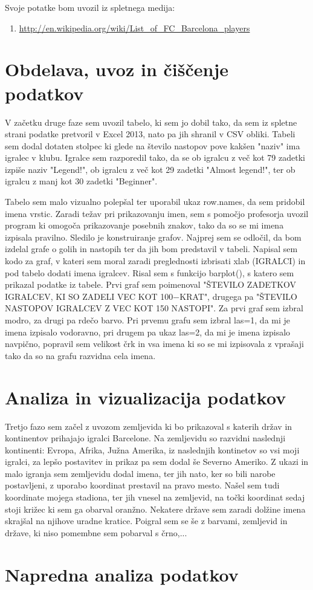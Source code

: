 \documentclass[11pt,a4paper]{article}
\begin{document}
Svoje potatke bom uvozil iz spletnega medija: 


\begin{enumerate}
\item{\url{http://en.wikipedia.org/wiki/List_of_FC_Barcelona_players
}}
\end{enumerate}

\section{Obdelava, uvoz in čiščenje podatkov}
V začetku druge faze sem uvozil tabelo, ki sem jo dobil tako, da sem iz spletne strani podatke pretvoril v Excel 2013, nato pa jih shranil v CSV obliki. Tabeli sem dodal dotaten stolpec ki glede na število nastopov pove kakšen "naziv" ima igralec v klubu. Igralce sem razporedil tako, da se ob igralcu z več kot 79 zadetki izpiše naziv "Legend!", ob igralcu z več kot 29 zadetki "Almost legend!", ter ob igralcu z manj kot 30 zadetki "Beginner".

Tabelo sem malo vizualno polepšal ter uporabil ukaz row.names, da sem pridobil imena vrstic. Zaradi težav pri prikazovanju imen, sem s pomočjo profesorja uvozil program ki omogoča prikazovanje posebnih znakov, tako da so se mi imena izpisala pravilno.
Sledilo je konstruiranje grafov. Najprej sem se odločil, da bom izdelal grafe o golih in nastopih ter da jih bom predstavil v tabeli. Napisal sem kodo za graf, v kateri sem moral zaradi preglednosti izbrisati xlab (IGRALCI) in pod tabelo dodati imena igralcev. Risal sem s funkcijo barplot(), s katero sem prikazal podatke iz tabele. Prvi graf sem poimenoval "ŠTEVILO ZADETKOV IGRALCEV, KI SO ZADELI VEC KOT 100−KRAT", drugega pa "ŠTEVILO NASTOPOV IGRALCEV Z VEC KOT 150 NASTOPI". Za prvi graf sem izbral modro, za drugi pa rdečo barvo. Pri prvemu grafu sem izbral las=1, da mi je imena izpisalo vodoravno, pri drugem pa ukaz las=2, da mi je imena izpisalo navpično, popravil sem velikost črk in vsa imena ki so se mi izpisovala z vprašaji tako da so na grafu razvidna cela imena.

\section{Analiza in vizualizacija podatkov}
Tretjo fazo sem začel z uvozom zemljevida ki bo prikazoval s katerih držav in kontinentov prihajajo igralci Barcelone. Na zemljevidu so razvidni naslednji kontinenti: Evropa, Afrika, Južna Amerika, iz naslednjih kontinetov so vsi moji igralci, za lepšo postavitev in prikaz pa sem dodal še Severno Ameriko. Z ukazi in malo igranja sem zemljevidu dodal imena, ter jih nato, ker so bili narobe postavljeni, z uporabo koordinat prestavil na pravo mesto. Našel sem tudi koordinate mojega stadiona, ter jih vnesel na zemljevid, na točki koordinat sedaj stoji križec ki sem ga obarval oranžno. Nekatere države sem zaradi dolžine imena skrajšal na njihove uradne kratice. Poigral sem se še z barvami, zemljevid in države, ki niso pomembne sem pobarval s črno,...


\section{Napredna analiza podatkov}
\end{document}
